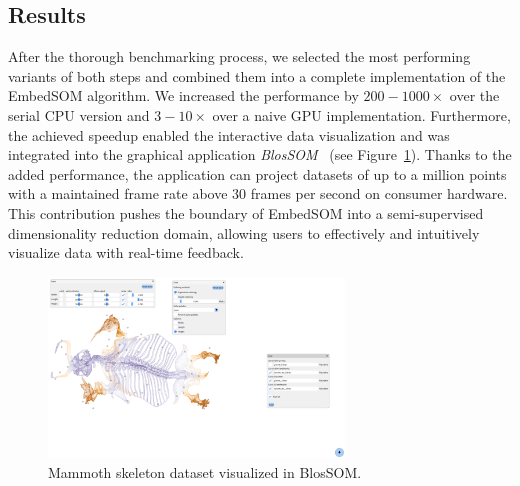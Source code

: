 \subsection{Results}

After the thorough benchmarking process, we selected the most performing variants of both steps and combined them into a complete implementation of the EmbedSOM algorithm. We increased the performance by $200-1000\times$ over the serial CPU version and $3-10\times$ over a naive GPU implementation. Furthermore, the achieved speedup enabled the interactive data visualization and was integrated into the graphical application \emph{BlosSOM}~\cite{molnarova2023throughput} (see Figure~\ref{fig:blossom}). Thanks to the added performance, the application can project datasets of up to a million points with a maintained frame rate above $30$ frames per second on consumer hardware. This contribution pushes the boundary of EmbedSOM into a semi-supervised dimensionality reduction domain, allowing users to effectively and intuitively visualize data with real-time feedback.

\begin{figure}   
    \centering
    \includegraphics[width=0.7\textwidth]{img/blossom.png}
    \caption{Mammoth skeleton dataset visualized in BlosSOM.}
    \label{fig:blossom}
\end{figure}



